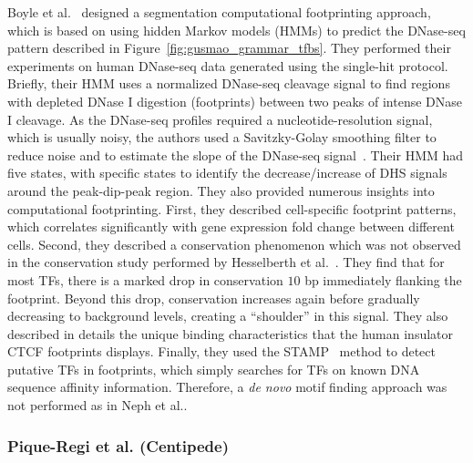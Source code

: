 Boyle et al.~\cite{boyle2011} designed a segmentation computational footprinting approach, which is based on using hidden Markov models (HMMs) to predict the DNase-seq pattern described in Figure~\ref{fig:gusmao_grammar_tfbs}. They performed their experiments on human DNase-seq data generated using the single-hit protocol. Briefly, their HMM uses a normalized DNase-seq cleavage signal to find regions with depleted DNase I digestion (footprints) between two peaks of intense DNase I cleavage. As the DNase-seq profiles required a nucleotide-resolution signal, which is usually noisy, the authors used a Savitzky-Golay smoothing filter to reduce noise and to estimate the slope of the DNase-seq signal~\cite{madden1978}. Their HMM had five states, with specific states to identify the decrease/increase of DHS signals around the peak-dip-peak region. They also provided numerous insights into computational footprinting. First, they described cell-specific footprint patterns, which correlates significantly with gene expression fold change between different cells. Second, they described a conservation phenomenon which was not observed in the conservation study performed by Hesselberth et al.~\cite{hesselberth2009}. They find that for most TFs, there is a marked drop in conservation \approxy$10$ bp immediately flanking the footprint. Beyond this drop, conservation increases again before gradually decreasing to background levels, creating a ``shoulder'' in this signal. They also described in details the unique binding characteristics that the human insulator CTCF footprints displays. Finally, they used the STAMP~\cite{mahony2007} method to detect putative TFs in footprints, which simply searches for TFs on known DNA sequence affinity information. Therefore, a \emph{de novo} motif finding approach was not performed as in Neph et al.\cite{neph2012a}.

\subsubsection{Pique-Regi et al. (Centipede)}
\label{sec:piqueregi.2}

